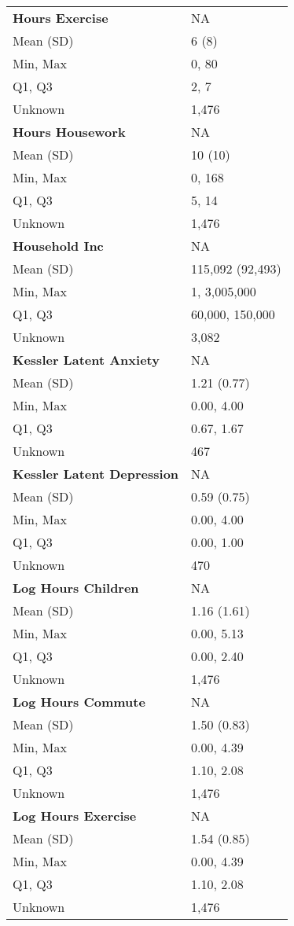 \documentclass[
  single column]{article}
\begin{document}
\begin{longtable}[]{@{}ll@{}}
\textbf{Hours Exercise} & NA \\
Mean (SD) & 6 (8) \\
Min, Max & 0, 80 \\
Q1, Q3 & 2, 7 \\
Unknown & 1,476 \\
\textbf{Hours Housework} & NA \\
Mean (SD) & 10 (10) \\
Min, Max & 0, 168 \\
Q1, Q3 & 5, 14 \\
Unknown & 1,476 \\
\textbf{Household Inc} & NA \\
Mean (SD) & 115,092 (92,493) \\
Min, Max & 1, 3,005,000 \\
Q1, Q3 & 60,000, 150,000 \\
Unknown & 3,082 \\
\textbf{Kessler Latent Anxiety} & NA \\
Mean (SD) & 1.21 (0.77) \\
Min, Max & 0.00, 4.00 \\
Q1, Q3 & 0.67, 1.67 \\
Unknown & 467 \\
\textbf{Kessler Latent Depression} & NA \\
Mean (SD) & 0.59 (0.75) \\
Min, Max & 0.00, 4.00 \\
Q1, Q3 & 0.00, 1.00 \\
Unknown & 470 \\
\textbf{Log Hours Children} & NA \\
Mean (SD) & 1.16 (1.61) \\
Min, Max & 0.00, 5.13 \\
Q1, Q3 & 0.00, 2.40 \\
Unknown & 1,476 \\
\textbf{Log Hours Commute} & NA \\
Mean (SD) & 1.50 (0.83) \\
Min, Max & 0.00, 4.39 \\
Q1, Q3 & 1.10, 2.08 \\
Unknown & 1,476 \\
\textbf{Log Hours Exercise} & NA \\
Mean (SD) & 1.54 (0.85) \\
Min, Max & 0.00, 4.39 \\
Q1, Q3 & 1.10, 2.08 \\
Unknown & 1,476 \\

\end{longtable}
\end{document}

